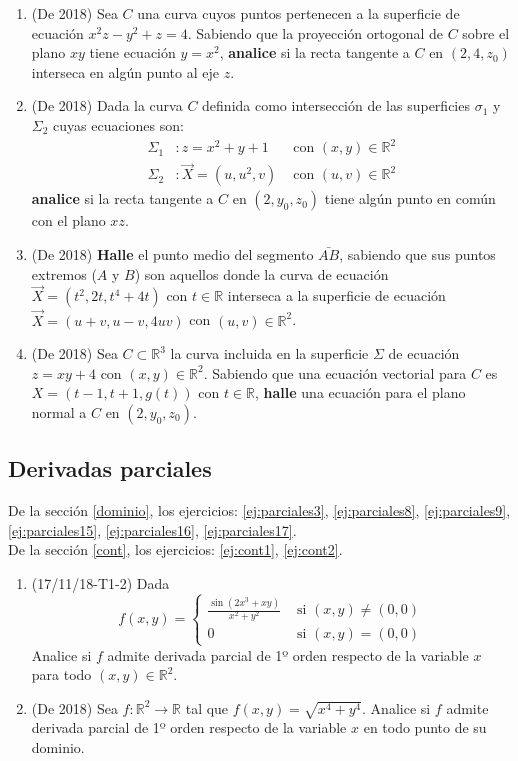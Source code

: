 \documentclass[12pt,a4paper]{article}
\renewcommand{\b}[1]{\textbf{#1}}
\newcommand{\R}{\mathbb{R}}
\begin{document}
\begin{enumerate}
	\item (De 2018) Sea $ C $ una curva cuyos puntos pertenecen a la superficie de ecuación $ x^2 z -y^2 +z = 4  $. Sabiendo que la proyección ortogonal de $ C $ sobre el plano $ xy $ tiene ecuación $ y = x^2 $, \b{analice} si la recta tangente a $ C $ en $ (2, 4, z_0 ) $ interseca en algún punto al eje $ z $.
	
	\item (De 2018) Dada la curva $ C $ definida como intersección de las superficies $ \sigma_1 $ y $ \Sigma_2 $ cuyas ecuaciones son:
	\begin{align*}
		\Sigma_1 &: z = x^2 + y + 1 &\text{ con } (x, y) \in\R^2\\
		\Sigma_2 &: \vec{X} = (u, u^2, v) &\text{ con } (u, v) \in \R^2
	\end{align*}
	\b{analice} si la recta tangente a $ C $ en $ (2, y_0, z_0 ) $ tiene algún punto en común con el plano $ xz $.
	
	\item (De 2018) \b{Halle} el punto medio del segmento $\bar{AB}$, sabiendo que sus puntos extremos ($ A $ y $ B $) son aquellos donde la curva de ecuación $ \vec{X} = (t^2, 2 t, t^4 +4 t) $ con $t \in \R$ interseca a la superficie de ecuación $ \vec{X} = (u + v, u - v, 4 u v) $ con $(u, v) \in \R^2$.
	
	\item (De 2018) Sea $ C \subset\R^3 $ la curva incluida en la superficie $\Sigma$ de ecuación $ z = x y + 4  $ con $ (x, y)\in\R^2$. Sabiendo que una ecuación vectorial para $ C $ es $ X = (t - 1, t + 1, g(t)) $ con $ t\in\R$, \b{halle} una ecuación para el plano normal a $ C $ en $ (2, y_0, z_0 ) $.
	
\end{enumerate}

\subsection{Derivadas parciales}
De la sección \ref{dominio}, los ejercicios: \ref{ej:parciales3}, \ref{ej:parciales8}, \ref{ej:parciales9}, \ref{ej:parciales15}, 
\ref{ej:parciales16}, \ref{ej:parciales17}.\\

De la sección \ref{cont}, los ejercicios: \ref{ej:cont1}, \ref{ej:cont2}.\\

\begin{enumerate}
	\item (17/11/18-T1-2) Dada 
	\[f ( x, y ) = \begin{cases}
		\frac{\sin(2x^3+xy)}{x^2+y^2} & \text{ si } (x,y)\neq(0,0)\\
		0 & \text{ si } (x,y)=(0,0)
	\end{cases}\]
	Analice si $ f $ admite derivada parcial de 1º orden respecto de la variable $ x $ para todo $ ( x, y ) \in \R^2$.
	
	\item (De 2018) Sea $ f : \R^2 \rightarrow \R $ tal que $ f(x, y) = \sqrt{x^4 + y^4}  $. Analice si $ f $ admite derivada parcial de 1º orden respecto de la variable $ x $ en todo punto de su dominio.
\end{enumerate}
\end{document}
